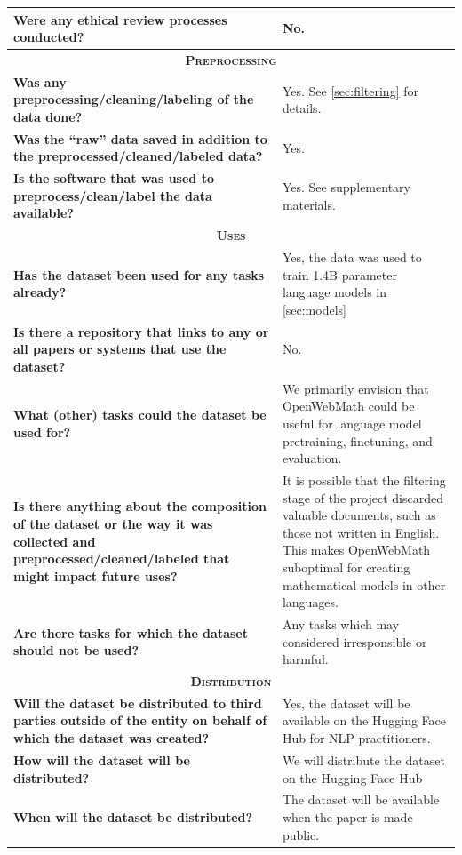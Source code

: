 \begin{longtable}{p{6cm}|p{6cm}}
    \textbf{Were any ethical review processes conducted?} & No. \\ \midrule
    \multicolumn{2}{c}{\textsc{\textbf{Preprocessing}}} \\ \midrule
    \textbf{Was any preprocessing/cleaning/labeling of the data done?} & Yes. See \autoref{sec:filtering} for details. \\ \midrule
    \textbf{Was the “raw” data saved in addition to the preprocessed/cleaned/labeled data?} & Yes. \\ \midrule
    \textbf{ Is the software that was used to preprocess/clean/label the data available?} & Yes. See supplementary materials. \\ \midrule
    \multicolumn{2}{c}{\textsc{\textbf{Uses}}} \\ \midrule
    \textbf{Has the dataset been used for any tasks already?} & Yes, the data was used to train 1.4B parameter language models in \autoref{sec:models} \\ \midrule
    \textbf{Is there a repository that links to any or all papers or systems that use the dataset?} & No. \\ \midrule
    \textbf{What (other) tasks could the dataset be used for?} & We primarily envision that OpenWebMath could be useful for language model pretraining, finetuning, and evaluation. \\ \midrule
    \textbf{Is there anything about the composition of the dataset or the way it was collected and preprocessed/cleaned/labeled that might impact future uses?} & It is possible that the filtering stage of the project discarded valuable documents, such as those not written in English. This makes OpenWebMath suboptimal for creating mathematical models in other languages. \\ \midrule
    \textbf{Are there tasks for which the dataset should not be used?} & Any tasks which may considered irresponsible or harmful. \\ \midrule
    \multicolumn{2}{c}{\textsc{\textbf{Distribution}}} \\ \midrule
    \textbf{Will the dataset be distributed to third parties outside of the entity on behalf of which the dataset was created?} & Yes, the dataset will be available on the Hugging Face Hub for NLP practitioners. \\ \midrule
    \textbf{How will the dataset will be distributed?} & We will distribute the dataset on the Hugging Face Hub \\ \midrule
    \textbf{When will the dataset be distributed?} & The dataset will be available when the paper is made public. \\ \midrule

\end{longtable}
